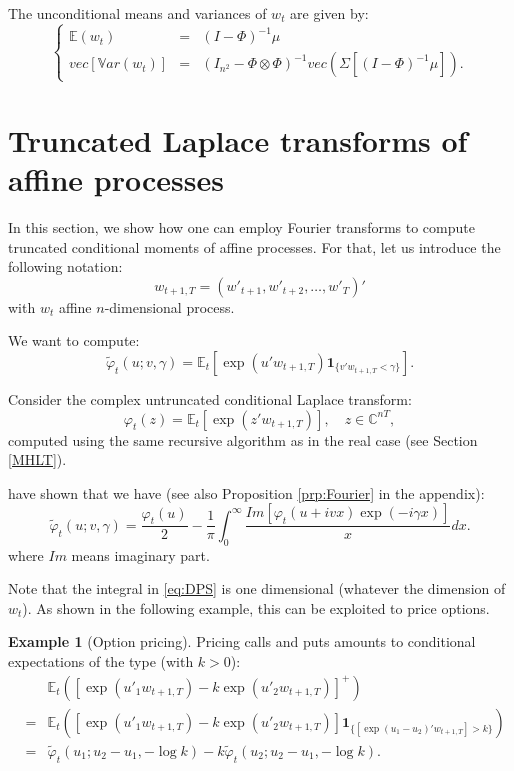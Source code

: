 \documentclass[
  12pt,
]{book}
\theoremstyle{definition}
\theoremstyle{definition}
\newtheorem{example}{Example}[chapter]
\theoremstyle{definition}
\theoremstyle{definition}
\theoremstyle{remark}
\begin{document}
The unconditional means and variances of \(w_t\) are given by:
\begin{equation}
\left\{
\begin{array}{ccl}
\mathbb{E}(w_t) &=& (I - \Phi)^{-1}\mu\\
vec[\mathbb{V}ar(w_t)] &=& (I_{n^2} - \Phi \otimes \Phi)^{-1} vec\left(\Sigma[(I - \Phi)^{-1}\mu]\right).
\end{array}
\right.\label{eq:uncondmeanvar}
\end{equation}

\hypertarget{TransfAna}{%
\section{Truncated Laplace transforms of affine processes}\label{TransfAna}}

In this section, we show how one can employ Fourier transforms to compute truncated conditional moments of affine processes. For that, let us introduce the following notation:
\[
w_{t+1,T} = (w'_{t+1}, w'_{t+2},\dots, w'_T)'
\]
with \(w_t\) affine \(n\)-dimensional process.

We want to compute:
\[
\tilde{\varphi}_t(u ; v, \gamma) = \mathbb{E}_t[\exp(u'w_{t+1,T})\textbf{1}_{\{v'w_{t+1,T}<\gamma\}}].
\]

Consider the complex untruncated conditional Laplace transform:
\[
\varphi_t(z) = \mathbb{E}_t[\exp(z'w_{t+1,T})],\quad  z \in \mathbb{C}^{nT},
\]
computed using the same recursive algorithm as in the real case (see Section \ref{MHLT}).

\citet{Duffie_Pan_Singleton_2000} have shown that we have (see also Proposition \ref{prp:Fourier} in the appendix):
\begin{equation}
\tilde{\varphi}_t(u ; v, \gamma) =  \frac{\varphi_t(u)}{2} - \frac{1}{\pi}
\int^\infty_0 \frac{Im[\varphi_t(u+ivx) \exp(-i\gamma x)]}{x} dx.\label{eq:DPS}
\end{equation}
where \(Im\) means imaginary part.

Note that the integral in \eqref{eq:DPS} is one dimensional (whatever the dimension of \(w_t\)). As shown in the following example, this can be exploited to price options.

\begin{example}[Option pricing]
\protect\hypertarget{exm:OptionPricing}{}\label{exm:OptionPricing}Pricing calls and puts amounts to conditional expectations of the type (with \(k > 0\)):
\begin{eqnarray*}
&& \mathbb{E}_t\left([\exp(u'_1 w_{t+1,T})-k   \exp(u'_2 w_{t+1,T})]^+\right) \\
&= &  \mathbb{E}_t\left([\exp(u'_1 w_{t+1,T})-k   \exp(u'_2 w_{t+1,T})]\textbf{1}_{\{[\exp(u_1-u_2)'w_{t+1,T}] > k \}}\right) \\
&= & \tilde{\varphi}_t(u_1 ; u_2-u_1, - \log   k) - k \tilde{\varphi}_t(u_2 ; u_2-u_1, - \log   k).
\end{eqnarray*}
\end{example}
\end{document}
